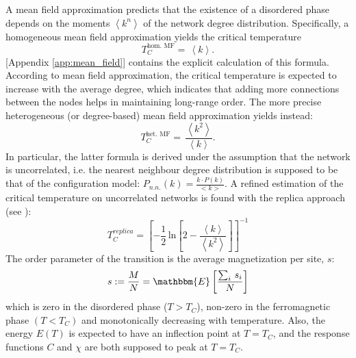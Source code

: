\noindent A mean field approximation predicts that the existence of a disordered phase depends on the moments $\left\langle k^n\right\rangle$ of the network degree distribution. Specifically, a homogeneous mean field approximation yields the critical temperature
\begin{equation} \label{eq:hom_mean_field}
    T_C^{\text{hom. MF}} =\,\left\langle k \right \rangle.
\end{equation}
[Appendix \ref{app:mean_field}] contains the explicit calculation of this formula. According to mean field approximation, the critical temperature is expected to increase with the average degree, which indicates that adding more connections between the nodes helps in maintaining long-range order. The more precise heterogeneous (or degree-based) mean field approximation yields instead:
\begin{equation} \label{eq:het_mean_field}
    T_C^{\text{het. MF}} =\,\frac{\left\langle k^2 \right \rangle}{\left\langle k \right \rangle}.
\end{equation}
In particular, the latter formula is derived under the assumption that the network is uncorrelated, i.e. the nearest neighbour degree distribution is supposed to be that of the configuration model: $P_{n.n.} (k)=\frac{k\cdot P(k)}{<k>}$.
A refined estimation of the critical temperature on uncorrelated networks is found with the replica approach (see \cite{analytical_ising}): 
\begin{equation}
    T_C^{replica} = \left[ -\frac{1}{2}\,\text{ln}\left[2- \frac{\left\langle k \right\rangle}{\left\langle k^2 \right\rangle}\right]\right]^{-1}
\label{eq:replica}    
\end{equation}
The order parameter of the transition is the average magnetization per site, $s$:
$$
s := \frac{M}{N} = \mathbbm{E}\left[\frac{\sum_{i}\,s_i}{N}\right]
$$
which is zero in the disordered phase ($T>T_C$), non-zero in the ferromagnetic  phase $(T<T_C)$ and monotonically decreasing with temperature. Also, the energy $E(T)$ is expected to have an inflection point at $T=T_C$, and the response functions $C$ and $\chi$ are both supposed to peak at $T=T_C$.

